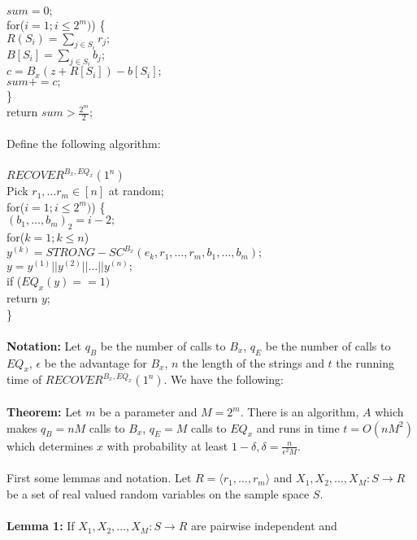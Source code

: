 \jt $sum= 0;$ \\
\jt for($i=1; i \leq 2^m)$) \{\\
\jt \jt $R(S_i)= \sum_{j \in S_i} r_j;$ \\
\jt \jt $B[S_i]= \sum_{j \in S_i} b_j;$ \\
\jt \jt $c= B_x(z+R[S_i]) -b[S_i];$ \\
\jt \jt $sum+= c;$\\
\jt \jt \}\\
\jt return $sum > {\frac {2^m} 2}$;\\
\\
Define the following algorithm:\\
\\
$RECOVER^{B_x, EQ_x}(1^n)$ \\
\jt Pick $r_1, \ldots r_m \in [n]$ at random;\\
\jt for($i=1; i \leq 2^m)$) \{\\
\jt \jt $(b_1, \ldots, b_m)_2 = i-2;$\\
\jt \jt for($k=1; k \leq n$)\\
\jt \jt \jt $y^{(k)}= STRONG-SC^{B_x}(e_k, r_1, \ldots, r_m, b_1, \ldots, b_m);$\\
\jt \jt $y= y^{(1)}||y^{(2)} || \ldots || y^{(n)};$\\
\jt \jt if ($EQ_x(y)==1)$ \\
\jt \jt \jt return $y$;\\
\jt \jt \}\\
\\
{\bf Notation:}
Let 
$q_B$ be the number of calls to $B_x$,
$q_E$ be the number of calls to $EQ_x$,
$\epsilon$ be the advantage for $B_x$,
$n$ the length of the strings and $t$  the running time of
$RECOVER^{B_x, EQ_x}(1^n)$. We have the following:
\\
\\
{\bf Theorem:} Let $m$ be a parameter and $M=2^m$.  There is an algorithm, $A$ which
makes $q_B= nM$ calls to $B_x$, $q_E= M$ calls to $EQ_x$ and runs in time
$t=O(nM^2)$ which determines $x$ with probability 
at least $1-\delta, \delta= {\frac n {\epsilon^2 M}}$.\\
\\
First some lemmas and notation.  Let $R= \langle r_1, \ldots , r_m \rangle$ and
$X_1, X_2, \ldots , X_M: S \rightarrow R$ be a set of real valued random variables on
the sample space $S$.\\
\\
{\bf Lemma 1:} If 
$X_1, X_2, \ldots , X_M: S \rightarrow R$ are pairwise independent and
